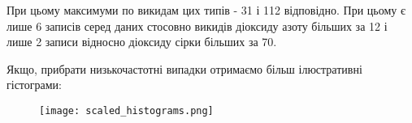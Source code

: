 При цьому максимуми по викидам цих типів - 31 і 112 відповідно. При цьому є лише 6 записів серед даних стосовно викидів діоксиду азоту більших за 12 і лише 2 записи відносно діоксиду сірки більших за 70.

Якщо, прибрати низькочастотні випадки отримаємо більш ілюстративні гістограми: 


\begin{center}
    \begin{figure}[h]
        \texttt{[image: scaled\_histograms.png]}
    \end{figure}
\end{center}
